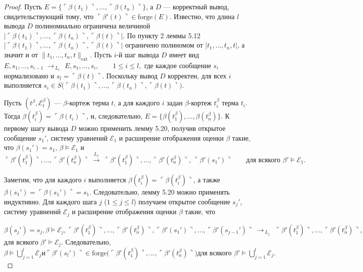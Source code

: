 \begin{proof}
Пусть \(E=\{\ulcorner\beta(t_{1})\urcorner,\dots,\ulcorner\beta(t_{n})\urcorner\}\), а \(D\) — корректный вывод,
свидетельствующий тому, что
\(\ulcorner\beta'(t)\urcorner\in\mathrm{forge}(E)\).
Известно, что длина \(l\) вывода \(D\) полиномиально ограничена величиной
\(\lvert\ulcorner\beta(t_{1})\urcorner,\dots,\ulcorner\beta(t_{n})\urcorner,\ulcorner\beta(t)\urcorner\rvert\).
По пункту 2 леммы 5.12
\(\lvert\ulcorner\beta(t_{1})\urcorner,\dots,\ulcorner\beta(t_{n})\urcorner,\ulcorner\beta(t)\urcorner\rvert\)
ограничено полиномом от
\(\lvert t_{1},\dots,t_{n},t\rvert\),
а значит и от
\(\lVert t_{1},\dots,t_{n},t\rVert_{\text{ext}}\).
Пусть \(i\)-й шаг вывода \(D\) имеет вид
\(
  E,s_{1},\dots,s_{i-1}
  \;\rightarrow_{\,L_{i}\,}\;
  E,s_{1},\dots,s_{i},
  \qquad 1\le i\le l,
\)
где каждое сообщение \(s_{i}\) нормализовано и
\(s_{l}=\ulcorner\beta(t)\urcorner\).
Поскольку вывод \(D\) корректен, для всех \(i\) выполняется
\(s_{i}\in S\!\bigl(\ulcorner\beta(t_{1})\urcorner,\dots,\ulcorner\beta(t_{n})\urcorner,\ulcorner\beta(t)\urcorner\bigr)\).

Пусть \((t^{\beta},\mathcal E_{t}^{\beta})\) — $\beta$-кортеж терма \(t\),
а для каждого \(i\) задан $\beta$-кортеж \(t_{i}^{\beta}\) терма \(t_{i}\).
Тогда \(\beta(t_{i}^{\beta})=\ulcorner\beta(t_{i})\urcorner\), и, следовательно,  
\(E=\{\beta(t_{1}^{\beta}),\dots,\beta(t_{n}^{\beta})\}\).
К первому шагу вывода \(D\) можно применить лемму 5.20, получив
открытое сообщение \(s_{1}'\), систему уравнений \(\mathcal E_{1}\)
и расширение отображения оценки \(\beta\) такие, что  
\(\beta(s_{1}') = s_{1}\), \(\beta\models\mathcal E_{1}\) и
\(
  \ulcorner\beta'(t_{1}^{\beta})\urcorner,\dots,
  \ulcorner\beta'(t_{n}^{\beta})\urcorner
  \;\xrightarrow{\,L_{1}\,}\;
  \ulcorner\beta'(t_{1}^{\beta})\urcorner,\dots,
  \ulcorner\beta'(t_{n}^{\beta})\urcorner,\,
  \ulcorner\beta'(s_{1}')\urcorner
  \qquad\text{для всякого } \beta'\models\mathcal E_{1}.
\)

Заметим, что для каждого $i$ выполняется
$\beta(t_{i}^{\beta})=\ulcorner\beta(t_{i}^{\beta})\urcorner$, 
а также $\beta(s_{1}')=\ulcorner\beta(s_{1}')\urcorner=s_{1}$.
Следовательно, лемму 5.20 можно применять индуктивно.
Для каждого шага $j$ ($1\le j\le l$) получаем открытое сообщение $s_{j}'$,
систему уравнений $\mathcal E_{j}$
и расширение отображения оценки $\beta$ такие, что

\(
  \beta(s_{j}') = s_{j}, 
  \beta \models \mathcal E_{j},
  \ulcorner\beta'(t_{1}^{\beta})\urcorner,\dots,
  \ulcorner\beta'(t_{n}^{\beta})\urcorner,
  \ulcorner\beta'(s_{1}')\urcorner,\dots,
  \ulcorner\beta'(s_{j-1}')\urcorner
  \;\rightarrow_{\,L_{j}\,}\;
  \ulcorner\beta'(t_{1}^{\beta})\urcorner,\dots,
  \ulcorner\beta'(t_{n}^{\beta})\urcorner,
  \ulcorner\beta'(s_{1}')\urcorner,\dots,
  \ulcorner\beta'(s_{j}')\urcorner
\)
для всякого $\beta' \models \mathcal E_{j}$.
Следовательно,
\(
   \beta \models \bigcup_{j=1}^{l}\mathcal E_{j}
   \text{и}
   \ulcorner\beta'(s_{l}')\urcorner
      \in
   \mathrm{forge}\bigl(
      \ulcorner\beta'(t_{1}^{\beta})\urcorner,\dots,
      \ulcorner\beta'(t_{n}^{\beta})\urcorner
   \bigr)
   \text{для всякого } \beta' \models \bigcup_{j=1}^{l}\mathcal E_{j}.
\)


\end{proof}
